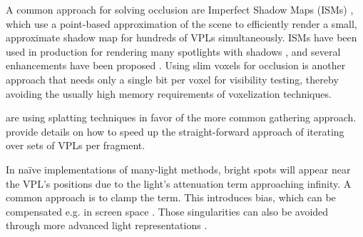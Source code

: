 A common approach for solving occlusion are Imperfect Sha\-dow Maps (ISMs) \cite{ritschel2008ism}, which use a point-based approximation of the scene to efficiently render a small, approximate shadow map for hundreds of VPLs simultaneously. ISMs have been used in production for rendering many spotlights with shadows \cite{evans2015dreams}, and several enhancements have been proposed \cite{ritschel2011ismsViewAdaptive, hollander2011manylods, barak2013temporally}. Using slim voxels \cite{sugihara2014layered, sun2015manylightsSVO, chen2016quantizing} for occlusion is another approach that needs only a single bit per voxel for visibility testing, thereby avoiding the usually high memory requirements of voxelization techniques.

\cite{dachsbacher2006splatting, Nichols:2009:splatting} are using splatting techniques in favor of the more common gathering approach. \cite{sloan2007image, laine2007incremental} provide details on how to speed up the straight-forward approach of iterating over sets of VPLs per fragment.

In na\"ive implementations of many-light methods, bright spots will appear near the VPL's positions due to the light's attenuation term approaching infinity. A common approach is to clamp the term. This introduces bias, which can be compensated e.g. in screen space \cite{novak2011screen}. Those singularities can also be avoided through more advanced light representations \cite{tokuyoshi2015vsgl}. \cite{olsson2012clustered}
